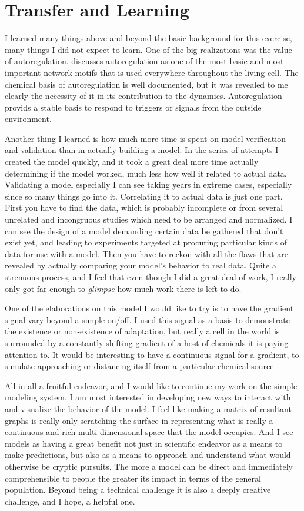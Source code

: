 \documentclass[12pt]{article}
\begin{document}
\section{Transfer and Learning}

I learned many things above and beyond the basic background for this exercise, many things I did not expect to learn.  One of the big realizations was the value of autoregulation.  \cite{Alon} discusses autoregulation as one of the most basic and most important network motifs that is used everywhere throughout the living cell.  The chemical basis of autoregulation is well documented, but it was revealed to me clearly the necessity of it in its contribution to the dynamics.  Autoregulation provids a stable basis to respond to triggers or signals from the outside environment.  

Another thing I learned is how much more time is spent on model verification and validation than in actually building a model.  In the series of attempts I created the model quickly, and it took a great deal more time actually determining if the model worked, much less how well it related to actual data.  Validating a model especially I can see taking years in extreme cases, especially since so many things go into it.  Correlating it to actual data is just one part.  First you have to find the data, which is probably incomplete or from several unrelated and incongruous studies which need to be arranged and normalized.  I can see the design of a model demanding certain data be gathered that don't exist yet, and leading to experiments targeted at procuring particular kinds of data for use with a model.  Then you have to reckon with all the flaws that are revealed by actually comparing your model's behavior to real data.  Quite a strenuous process, and I feel that even though I did a great deal of work, I really only got far enough to {\em glimpse} how much work there is left to do.  

One of the elaborations on this model I would like to try is to have the gradient signal vary beyond a simple on/off.  I used this signal as a basis to demonstrate the existence or non-existence of adaptation, but really a cell in the world is surrounded by a constantly shifting gradient of a host of chemicals it is paying attention to.  It would be interesting to have a continuous signal for a gradient, to simulate approaching or distancing itself from a particular chemical source.

All in all a fruitful endeavor, and I would like to continue my work on the simple modeling system.  I am most interested in developing new ways to interact with and visualize the behavior of the model.  I feel like making a matrix of resultant graphs is really only scratching the surface in representing what is really a continuous and rich multi-dimensional space that the model occupies.  And I see models as having a great benefit not just in scientific endeavor as a means to make predictions, but also as a means to approach and understand what would otherwise be cryptic pursuits.  The more a model can be direct and immediately comprehensible to people the greater its impact in terms of the general population.  Beyond being a technical challenge it is also a deeply creative challenge, and I hope, a helpful one.
\end{document}
